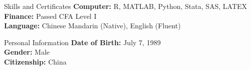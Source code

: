 \documentclass{resume} %
\begin{document}
\begin{rSection}{Skills and Certificates}
{\bf Computer:} R, MATLAB, Python, Stata, SAS, LATEX
\\
{\bf Finance:} Passed CFA Level I
\\
{\bf Language:} Chinese Mandarin (Native), English (Fluent) 
\end{rSection}
\bigskip \bigskip









\begin{rSection}{Personal Information }
{\bf Date of Birth:} July 7, 1989  \\
{\bf Gender:} Male  \\
{\bf Citizenship:} China
\\
\end{rSection}
\end{document}
